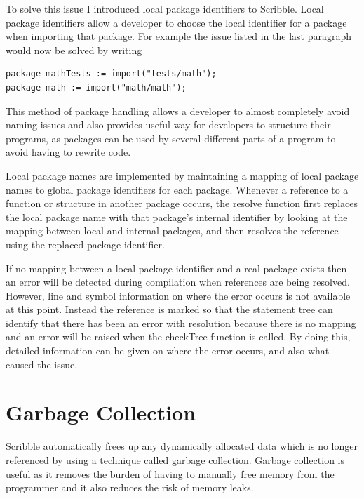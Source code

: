 \documentclass[]{final_report}
\begin{document}
To solve this issue I introduced local package identifiers to Scribble. Local package identifiers allow a developer to choose the local identifier for a package when importing that package. For example the issue listed in the last paragraph would now be solved by writing
\begin{verbatim}
package mathTests := import("tests/math");
package math := import("math/math");
\end{verbatim}

This method of package handling allows a developer to almost completely avoid naming issues and also provides useful way for developers to structure their programs, as packages can be used by several different parts of a program to avoid having to rewrite code.

Local package names are implemented by maintaining a mapping of local package names to global package identifiers for each package. Whenever a reference to a function or structure in another package occurs, the resolve function first replaces the local package name with that package's internal identifier by looking at the mapping between local and internal packages, and then resolves the reference using the replaced package identifier. 

If no mapping between a local package identifier and a real package exists then an error will be detected during compilation when references are being resolved. However, line and symbol information on where the error occurs is not available at this point. Instead the reference is marked so that the statement tree can identify that there has been an error with resolution because there is no mapping and an error will be raised when the checkTree function is called. By doing this, detailed information can be given on where the error occurs, and also what caused the issue.

\chapter{Garbage Collection}

Scribble automatically frees up any dynamically allocated data which is no longer referenced by using a technique called garbage collection. Garbage collection is useful as it removes the burden of having to manually free memory from the programmer and it also reduces the risk of memory leaks. 
\end{document}
